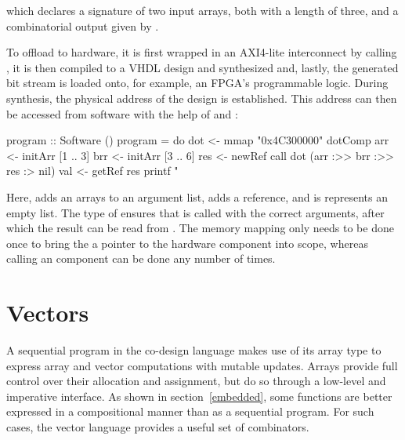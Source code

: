 \documentclass[../paper.tex]{subfiles}
\begin{document}


\noindent which declares a signature of two input arrays, both with a length of three, and a combinatorial output given by .

To offload  to hardware, it is first wrapped in an AXI4-lite interconnect by calling , it is then compiled to a VHDL design and synthesized and, lastly, the generated bit stream is loaded onto, for example, an FPGA's programmable logic. During synthesis, the physical address of the design is established. This address can then be accessed from software with the help of  and :

\begin{code}
program :: Software ()
program = do
  dot <- mmap "0x4C300000" dotComp
  arr <- initArr [1 .. 3]
  brr <- initArr [3 .. 6]
  res <- newRef
  call dot (arr :>> brr :>> res :> nil)
  val <- getRef res
  printf "%
\end{code}

\noindent Here, \codei{(:>>)} adds an arrays to an argument list, \codei{(:>)} adds a reference, and  is represents an empty list. The type of  ensures that  is called with the correct arguments, after which the result can be read from . The memory mapping only needs to be done once to bring the a pointer to the hardware component into scope, whereas calling an component can be done any number of times.

\section{Vectors}
\label{vectors}

A sequential program in the co-design language makes use of its array type to express array and vector computations with mutable updates. Arrays provide full control over their allocation and assignment, but do so through a low-level and imperative interface. As shown in section~\ref{embedded}, some functions are better expressed in a compositional manner than as a sequential program. For such cases, the vector language provides a useful set of combinators.
\end{document}
